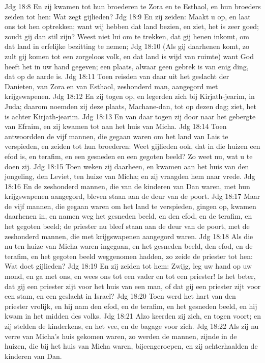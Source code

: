 Jdg 18:8  En zij kwamen tot hun broederen te Zora en te Esthaol, en hun broeders zeiden tot hen: Wat zegt gijlieden?
Jdg 18:9  En zij zeiden: Maakt u op, en laat ons tot hen optrekken; want wij hebben dat land bezien, en ziet, het is zeer goed; zoudt gij dan stil zijn? Weest niet lui om te trekken, dat gij henen inkomt, om dat land in erfelijke bezitting te nemen;
Jdg 18:10  (Als gij daarhenen komt, zo zult gij komen tot een zorgeloos volk, en dat land is wijd van ruimte) want God heeft het in uw hand gegeven; een plaats, alwaar geen gebrek is van enig ding, dat op de aarde is.
Jdg 18:11  Toen reisden van daar uit het geslacht der Danieten, van Zora en van Esthaol, zeshonderd man, aangegord met krijgswapenen.
Jdg 18:12  En zij togen op, en legerden zich bij Kirjath-jearim, in Juda; daarom noemden zij deze plaats, Machane-dan, tot op dezen dag; ziet, het is achter Kirjath-jearim.
Jdg 18:13  En van daar togen zij door naar het gebergte van Efraim, en zij kwamen tot aan het huis van Micha.
Jdg 18:14  Toen antwoordden de vijf mannen, die gegaan waren om het land van Lais te verspieden, en zeiden tot hun broederen: Weet gijlieden ook, dat in die huizen een efod is, en terafim, en een gesneden en een gegoten beeld? Zo weet nu, wat u te doen zij.
Jdg 18:15  Toen weken zij daarheen, en kwamen aan het huis van den jongeling, den Leviet, ten huize van Micha; en zij vraagden hem naar vrede.
Jdg 18:16  En de zeshonderd mannen, die van de kinderen van Dan waren, met hun krijgswapenen aangegord, bleven staan aan de deur van de poort.
Jdg 18:17  Maar de vijf mannen, die gegaan waren om het land te verspieden, gingen op, kwamen daarhenen in, en namen weg het gesneden beeld, en den efod, en de terafim, en het gegoten beeld; de priester nu bleef staan aan de deur van de poort, met de zeshonderd mannen, die met krijgswapenen aangegord waren.
Jdg 18:18  Als die nu ten huize van Micha waren ingegaan, en het gesneden beeld, den efod, en de terafim, en het gegoten beeld weggenomen hadden, zo zeide de priester tot hen: Wat doet gijlieden?
Jdg 18:19  En zij zeiden tot hem: Zwijg, leg uw hand op uw mond, en ga met ons, en wees ons tot een vader en tot een priester! Is het beter, dat gij een priester zijt voor het huis van een man, of dat gij een priester zijt voor een stam, en een geslacht in Israel?
Jdg 18:20  Toen werd het hart van den priester vrolijk, en hij nam den efod, en de terafim, en het gesneden beeld, en hij kwam in het midden des volks.
Jdg 18:21  Alzo keerden zij zich, en togen voort; en zij stelden de kinderkens, en het vee, en de bagage voor zich.
Jdg 18:22  Als zij nu verre van Micha's huis gekomen waren, zo werden de mannen, zijnde in de huizen, die bij het huis van Micha waren, bijeengeroepen, en zij achterhaalden de kinderen van Dan.
